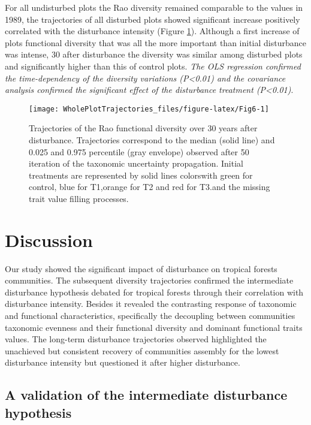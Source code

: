 \documentclass[fleqn,10pt]{ArtEcoFoG} %
\theoremstyle{definition}
\theoremstyle{definition}
\theoremstyle{definition}
\theoremstyle{remark}
\begin{document}
For all undisturbed plots the Rao diversity remained comparable to the
values in 1989, the trajectories of all disturbed plots showed
significant increase positively correlated with the disturbance
intensity (Figure \ref{fig:Fig6}). Although a first increase of plots
functional diversity that was all the more important than initial
disturbance was intense, 30 after disturbance the diversity was similar
among disturbed plots and significantly higher than this of control
plots. \emph{The OLS regression confirmed the time-dependency of the
diversity variations (P\textless{}0.01) and the covariance analysis
confirmed the significant effect of the disturbance treatment
(P\textless{}0.01)}.

\begin{figure}

{\centering \texttt{[image: WholePlotTrajectories\_files/figure-latex/Fig6-1]} 

}

\caption{Trajectories of the Rao functional diversity over 30 years after disturbance. Trajectories correspond to the median (solid line) and 0.025 and 0.975 percentile (gray envelope) observed after 50 iteration of the taxonomic uncertainty propagation. Initial treatments are represented by solid lines colorswith green for control, blue for T1,orange for T2 and red for T3.and the missing trait value filling processes.}\label{fig:Fig6}
\end{figure}

\section{Discussion}\label{discussion}

Our study showed the significant impact of disturbance on tropical
forests communities. The subsequent diversity trajectories confirmed the
intermediate disturbance hypothesis debated for tropical forests through
their correlation with disturbance intensity. Besides it revealed the
contrasting response of taxonomic and functional characteristics,
specifically the decoupling between communities taxonomic evenness and
their functional diversity and dominant functional traits values. The
long-term disturbance trajectories observed highlighted the unachieved
but consistent recovery of communities assembly for the lowest
disturbance intensity but questioned it after higher disturbance.

\subsection{A validation of the intermediate disturbance
hypothesis}\label{a-validation-of-the-intermediate-disturbance-hypothesis}
\end{document}
